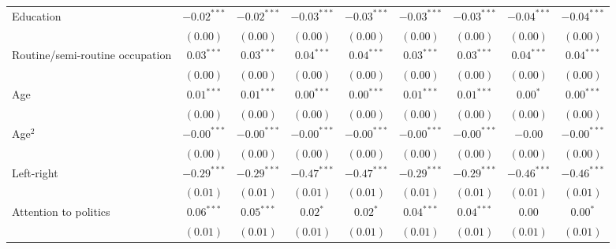 \documentclass[12pt, letter]{scrartcl}
\begin{document}
\begin{tiny}
\begin{longtable}{lcccccccc}
Education                                   & $-0.02^{***}$ & $-0.02^{***}$ & $-0.03^{***}$ & $-0.03^{***}$ & $-0.03^{***}$ & $-0.03^{***}$ & $-0.04^{***}$ & $-0.04^{***}$ \\
                                            & $(0.00)$      & $(0.00)$      & $(0.00)$      & $(0.00)$      & $(0.00)$      & $(0.00)$      & $(0.00)$      & $(0.00)$      \\
Routine/semi-routine occupation             & $0.03^{***}$  & $0.03^{***}$  & $0.04^{***}$  & $0.04^{***}$  & $0.03^{***}$  & $0.03^{***}$  & $0.04^{***}$  & $0.04^{***}$  \\
                                            & $(0.00)$      & $(0.00)$      & $(0.00)$      & $(0.00)$      & $(0.00)$      & $(0.00)$      & $(0.00)$      & $(0.00)$      \\
Age                                         & $0.01^{***}$  & $0.01^{***}$  & $0.00^{***}$  & $0.00^{***}$  & $0.01^{***}$  & $0.01^{***}$  & $0.00^{*}$    & $0.00^{***}$  \\
                                            & $(0.00)$      & $(0.00)$      & $(0.00)$      & $(0.00)$      & $(0.00)$      & $(0.00)$      & $(0.00)$      & $(0.00)$      \\
Age$^2$                                     & $-0.00^{***}$ & $-0.00^{***}$ & $-0.00^{***}$ & $-0.00^{***}$ & $-0.00^{***}$ & $-0.00^{***}$ & $-0.00$       & $-0.00^{***}$ \\
                                            & $(0.00)$      & $(0.00)$      & $(0.00)$      & $(0.00)$      & $(0.00)$      & $(0.00)$      & $(0.00)$      & $(0.00)$      \\                                            
Left-right                                  & $-0.29^{***}$ & $-0.29^{***}$ & $-0.47^{***}$ & $-0.47^{***}$ & $-0.29^{***}$ & $-0.29^{***}$ & $-0.46^{***}$ & $-0.46^{***}$ \\
                                            & $(0.01)$      & $(0.01)$      & $(0.01)$      & $(0.01)$      & $(0.01)$      & $(0.01)$      & $(0.01)$      & $(0.01)$      \\
Attention to politics                       & $0.06^{***}$  & $0.05^{***}$  & $0.02^{*}$    & $0.02^{*}$    & $0.04^{***}$  & $0.04^{***}$  & $0.00$        & $0.00^{*}$    \\
                                            & $(0.01)$      & $(0.01)$      & $(0.01)$      & $(0.01)$      & $(0.01)$      & $(0.01)$      & $(0.01)$      & $(0.01)$      \\

\end{longtable}
\end{tiny}
\end{document}
